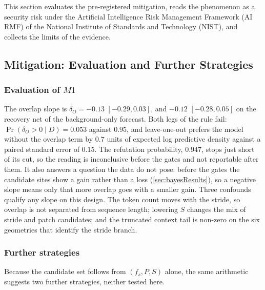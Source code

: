 This section evaluates the pre-registered mitigation, reads the phenomenon as a security risk under the Artificial Intelligence Risk Management Framework (AI RMF) of the National Institute of Standards and Technology (NIST), and collects the limits of the evidence.

\subsection{Mitigation: Evaluation and Further Strategies}\label{sec:mitigationDiscussion}
\begingroup
\let\subsection\subsubsection
\subsection*{Evaluation of $M1$}

The overlap slope is $\delta_O=-0.13$ $[-0.29,0.03]$, and $-0.12$ $[-0.28,0.05]$ on the recovery net of the background-only forecast. Both legs of the rule fail: $\Pr(\delta_O>0\mid D)=0.053$ against $0.95$, and leave-one-out prefers the model without the overlap term by $0.7$ units of expected log predictive density against a paired standard error of $0.15$. The refutation probability, $0.947$, stops just short of its cut, so the reading is inconclusive before the gates and not reportable after them. It also answers a question the data do not pose: before the gates the candidate sites show a gain rather than a loss (\autoref{sec:bayesResults}), so a negative slope means only that more overlap goes with a smaller gain. Three confounds qualify any slope on this design. The token count moves with the stride, so overlap is not separated from sequence length; lowering $S$ changes the mix of stride and patch candidates; and the truncated context tail is non-zero on the six geometries that identify the stride branch.

\subsection*{Further strategies}

Because the candidate set follows from $(f_s,P,S)$ alone, the same arithmetic suggests two further strategies, neither tested here.

